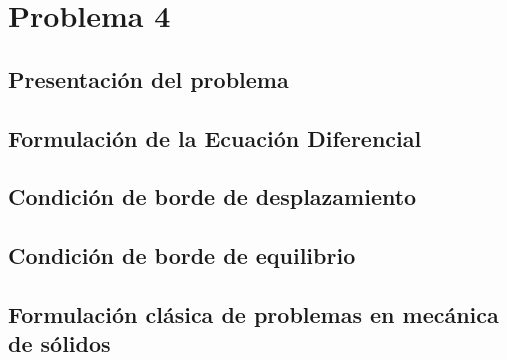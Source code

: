 \section{Problema 4}
\subsection{Presentación del problema}
\subsection{Formulación de la Ecuación Diferencial}
\subsection{Condición de borde de desplazamiento}
\subsection{Condición de borde de equilibrio}
\subsection{Formulación clásica de problemas en mecánica de sólidos}
